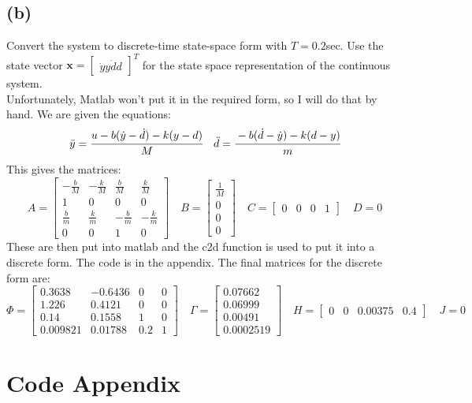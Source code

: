 \documentclass{article}
\begin{document}
\subsection*{(b)}
Convert the system to discrete-time state-space form with $T=0.2$sec. Use the state vector $\pmb{x}=\begin{bmatrix}\dot{y} y \dot{d} d\end{bmatrix}^T$ for the state space representation of the continuous system.\\
Unfortunately, Matlab won't put it in the required form, so I will do that by hand. We are given the equations:
\[\ddot{y}=\cfrac{u-b(\dot{y}-\dot{d})-k(y-d)}{M}\quad \ddot{d}=\cfrac{-b(\dot{d}-\dot{y})-k(d-y)}{m}\]
This gives the matrices:
\[A=\begin{bmatrix}-\frac{b}{M}&-\frac{k}{M}&\frac{b}{M}&\frac{k}{M}\\[0.3em]1&0&0&0\\[0.3em]\frac{b}{m}&\frac{k}{m}&-\frac{b}{m}&-\frac{k}{m}\\[0.3em]0&0&1&0\end{bmatrix}\quad B=\begin{bmatrix}\frac{1}{M}\\0\\0\\0\end{bmatrix}\quad C=\begin{bmatrix}0&0&0&1\end{bmatrix}\quad D=0\]
These are then put into matlab and the c2d function is used to put it into a discrete form. The code is in the appendix. The final matrices for the discrete form are:
\[\Phi=\begin{bmatrix}0.3638&-0.6436&0&0\\1.226&0.4121 &0&0\\0.14&0.1558&1&0\\0.009821&0.01788&0.2&1\end{bmatrix}\quad \Gamma=\begin{bmatrix}0.07662\\0.06999\\0.00491\\0.0002519\end{bmatrix} \quad H=\begin{bmatrix}0&0&0.00375&0.4\end{bmatrix}\quad J=0\]

\appendix
\section*{Code Appendix}

\end{document}
